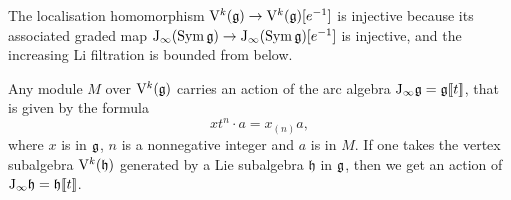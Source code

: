 \begin{remark}
	The localisation homomorphism $\mathrm V^k(\mathfrak g) \rightarrow \mathrm V^k(\mathfrak g)[e^{-1}]$ is injective because its associated graded map $\mathrm{J}_\infty(\operatorname{Sym} \mathfrak g) \rightarrow \mathrm{J}_\infty(\operatorname{Sym} \mathfrak g)[e^{-1}]$ is injective, and the increasing Li filtration is bounded from below.
\end{remark}

Any module $M$ over $\mathrm V^k(\mathfrak g)$ carries an action of the arc algebra $\mathrm{J}_\infty \mathfrak g = \mathfrak g[\![t]\!]$, that is given by the formula
\[ x t^n \cdot a = x_{(n)} a, \]
where $x$ is in $\mathfrak g$, $n$ is a nonnegative integer and $a$ is in $M$. If one takes the vertex subalgebra $\mathrm V^k(\mathfrak h)$ generated by a Lie subalgebra $\mathfrak{h}$ in $\mathfrak g$, then we get an action of $\mathrm{J}_\infty \mathfrak h = \mathfrak h[\![t]\!]$.

